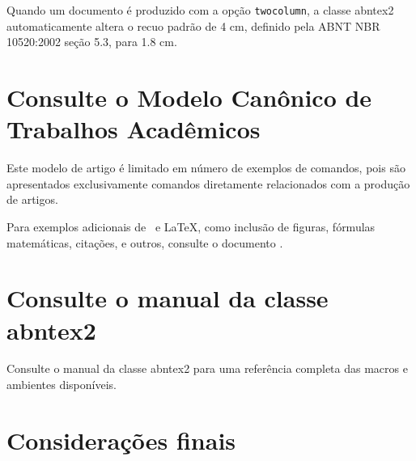 \documentclass[article,11pt,oneside,a4paper,english]{abntex2}
\begin{document}
Quando um documento é produzido com a opção \texttt{twocolumn}, a classe
\textsf{abntex2} automaticamente altera o recuo padrão de 4 cm, definido pela
ABNT NBR 10520:2002 seção 5.3, para 1.8 cm.

\section{Consulte o Modelo Canônico de Trabalhos Acadêmicos}

Este modelo de artigo é limitado em número de exemplos de comandos, pois são
apresentados exclusivamente comandos diretamente relacionados com a produção de
artigos.

Para exemplos adicionais de \abnTeX\ e \LaTeX, como inclusão de figuras,
fórmulas matemáticas, citações, e outros, consulte o documento
.

\section{Consulte o manual da classe \textsf{abntex2}}

Consulte o manual da classe \textsf{abntex2} \cite{abntex2classe} para uma
referência completa das macros e ambientes disponíveis.

% 

\section*{Considerações finais}

\lipsum[1]

\begin{citacao}
\lipsum[2]
\end{citacao}

\lipsum[3]

\postextual



%
%
\end{document}
